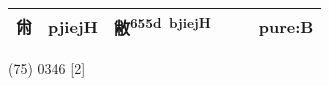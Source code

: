 \documentclass[14pt,a4paper]{scrartcl}
\begin{document}
\begin{longtable}[c]{@{}llllll@{}}
\begin{minipage}[t]{0.14\columnwidth}
㡀
\strut\end{minipage} &
\begin{minipage}[t]{0.14\columnwidth}\raggedright\strut
pjiejH
\strut\end{minipage} &
\begin{minipage}[t]{0.14\columnwidth}\raggedright\strut
敝\textsuperscript{655d~bjiejH}
\strut\end{minipage} &
\begin{minipage}[t]{0.14\columnwidth}\raggedright\strut
\strut\end{minipage} &
\begin{minipage}[t]{0.14\columnwidth}\raggedright\strut
\strut\end{minipage} &
\begin{minipage}[t]{0.14\columnwidth}\raggedright\strut
pure:B
\strut\end{minipage}\tabularnewline
\bottomrule
\end{longtable}

(75) 0346 {[}2{]}
\end{document}
